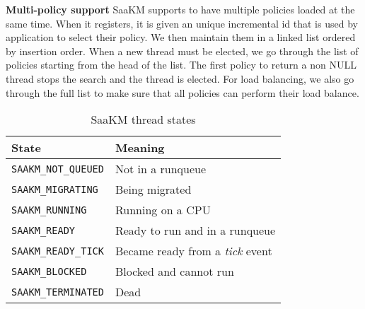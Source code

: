 \par \textbf{Multi-policy support} SaaKM supports to have multiple policies loaded at the same time. When it registers, it is given an unique incremental id that is used by application to select their policy. We then maintain them in a linked list ordered by insertion order. When a new thread must be elected, we go through the list of policies starting from the head of the list. The first policy to return a non NULL thread stops the search and the thread is elected. For load balancing, we also go through the full list to make sure that all policies can perform their load balance.
\begin{table}[htbp]
        \caption{SaaKM thread states}
        \begin{tabular}{|l|l|}
        \hline
        \textbf{State} & \textbf{Meaning} \\
                \hline
                \texttt{SAAKM\_NOT\_QUEUED} & Not in a runqueue \\
                \hline
                \texttt{SAAKM\_MIGRATING} & Being migrated \\
                \hline
                \texttt{SAAKM\_RUNNING} & Running on a CPU \\
                \hline
                \texttt{SAAKM\_READY} & Ready to run and in a runqueue \\
                \hline
                \texttt{SAAKM\_READY\_TICK} & Became ready from a \textit{tick} event \\
                \hline
                \texttt{SAAKM\_BLOCKED} & Blocked and cannot run \\
                \hline
                \texttt{SAAKM\_TERMINATED} & Dead \\
                \hline
        \end{tabular}
        
\label{tab:saakm-states}
\end{table}
\pagebreak

